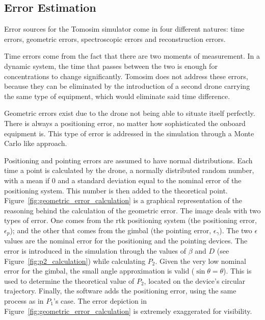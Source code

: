 \subsection{Error Estimation}%
\label{sub:error_estimation}

Error sources for the Tomosim simulator come in four different natures:
time errors, geometric errors, spectroscopic errors and reconstruction
errors.

Time errors come from the fact that there are two moments of
measurement. In a dynamic system, the time that passes between the two
is enough for concentrations to change significantly. Tomosim does not
address these errors, because they can be eliminated by the introduction
of a second drone carrying the same type of equipment, which would
eliminate said time difference.

Geometric errors exist due to the drone not being able to situate
itself perfectly. There is always a positioning error, no matter how
sophisticated the onboard equipment is. This type of error is addressed
in the simulation through a Monte Carlo like approach.

Positioning and pointing errors are assumed to have normal
distributions. Each time a point is calculated by the drone, a normally
distributed random number, with a mean if 0 and a standard deviation
equal to the nominal error of the positioning system. This number is
then added to the theoretical point.
Figure~\ref{fig:geometric_error_calculation} is a graphical
representation of the reasoning behind the calculation of the geometric
error. The image deals with two types of error. One comes from the
\gls{rtk} positioning system (the positioning error, $\epsilon_p$); and
the other that comes from the gimbal (the pointing error,
$\epsilon_\gamma$). The two $\epsilon$ values are the nominal error for
the positioning and the pointing devices. The error is introduced in the
simulation through the values of $\beta$ and $D$ (see
Figure~\ref{fig:p2_calculation}) while calculating $P_2$. Given the very
low nominal error for the gimbal, the small angle approximation is valid
($\sin \theta = \theta$). This is used to determine the theoretical
value of $P_2$, located on the device's circular trajectory. Finally,
the software adds the positioning error, using the same process as in
$P_1$'s case. The error depiction in
Figure~\ref{fig:geometric_error_calculation} is extremely exaggerated
for visibility.

